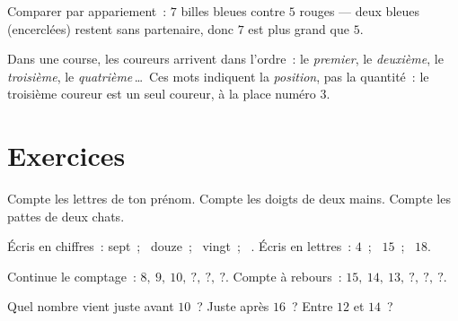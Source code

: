 \begin{omfigure}

{\small Comparer par appariement~: $7$ billes bleues contre $5$ rouges
--- deux bleues (encerclées) restent sans partenaire, donc $7$ est
plus grand que $5$.}
\end{omfigure}

\begin{example}\label{ex:g1:counting:ordinal}
Dans une course, les coureurs arrivent dans l'ordre~: le \emph{premier},
le \emph{deuxième}, le \emph{troisième}, le \emph{quatrième}\,\dots\
Ces mots indiquent la \emph{position}, pas la quantité~: le troisième
coureur est un seul coureur, à la place numéro $3$.
\end{example}

\section{Exercices}

\begin{exercise}[$\star$]\label{exo:g1:counting:1}
Compte les lettres de ton prénom. Compte les doigts de deux mains.
Compte les pattes de deux chats.
\end{exercise}

\begin{exercise}[$\star$]\label{exo:g1:counting:2}
Écris en chiffres~: sept~; \ douze~; \ vingt~; \ . Écris en
lettres~: $4$~; \ $15$~; \ $18$.
\end{exercise}

\begin{exercise}[$\star$]\label{exo:g1:counting:3}
Continue le comptage~: $8,\ 9,\ 10,\ ?,\ ?,\ ?$. Compte à rebours~:
$15,\ 14,\ 13,\ ?,\ ?,\ ?$.
\end{exercise}

\begin{exercise}[$\star$]\label{exo:g1:counting:4}
Quel nombre vient juste avant $10$~? Juste après $16$~? Entre
$12$ et $14$~?
\end{exercise}

